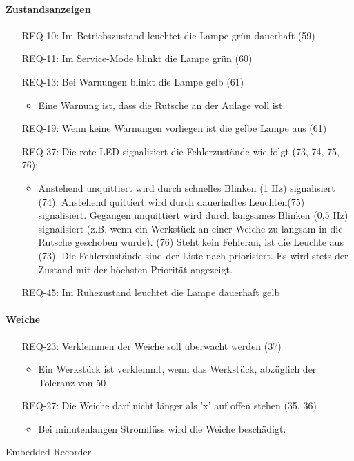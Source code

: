 \paragraph{Zustandsanzeigen}
\begin{itemize}
    \item[REQ-10:] Im Betriebszustand leuchtet die Lampe grün dauerhaft (59)
    \item[REQ-11:] Im Service-Mode blinkt die Lampe grün (60)
    \item[REQ-13:] Bei Warnungen blinkt die Lampe gelb (61)
    \begin{itemize}
        \item Eine Warnung ist, dass die Rutsche an der Anlage voll ist.
    \end{itemize}
    \item[REQ-19:] Wenn keine Warnungen vorliegen ist die gelbe Lampe aus (61)
    \item[REQ-37:] Die rote LED signalisiert die Fehlerzustände wie folgt (73, 74, 75, 76):
    \begin{itemize}
        \item Anstehend unquittiert wird durch schnelles Blinken (1 Hz) signalisiert (74). Anstehend quittiert wird durch dauerhaftes Leuchten(75) signalisiert. Gegangen unquittiert wird durch langsames Blinken (0,5 Hz) signalisiert (z.B. wenn ein Werkstück an einer Weiche zu langsam in die Rutsche geschoben wurde). (76) Steht kein Fehleran, ist die Leuchte aus (73). Die Fehlerzustände sind der Liste nach priorisiert. Es wird stets der Zustand mit der höchsten Priorität angezeigt.
    \end{itemize}
    \item[REQ-45:] Im Ruhezustand leuchtet die Lampe dauerhaft gelb
\end{itemize}

\paragraph{Weiche}
\begin{itemize}
    \item[REQ-23:] Verklemmen der Weiche soll überwacht werden (37)
    \begin{itemize}
        \item Ein Werkstück ist verklemmt, wenn das Werkstück, abzüglich der Toleranz von 50%
    \end{itemize}
    \item[REQ-27:] Die Weiche darf nicht länger als 'x' auf offen stehen (35, 36)
    \begin{itemize}
        \item Bei minutenlangen Stromflüss wird die Weiche beschädigt.
    \end{itemize}
\end{itemize}
Embedded Recorder
